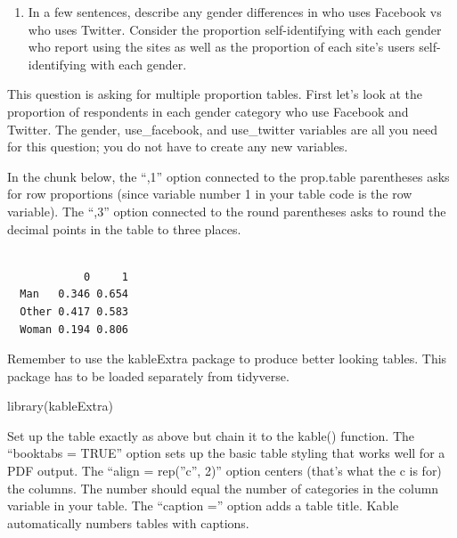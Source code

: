\documentclass[
  letterpaper,
  DIV=11,
  numbers=noendperiod]{scrartcl}
\newenvironment{Shaded}{\begin{snugshade}}{\end{snugshade}}
\newcommand{\DecValTok}[1]{\textcolor[rgb]{0.68,0.00,0.00}{#1}}
\newcommand{\FunctionTok}[1]{\textcolor[rgb]{0.28,0.35,0.67}{#1}}
\newcommand{\NormalTok}[1]{\textcolor[rgb]{0.00,0.23,0.31}{#1}}
\newcommand{\SpecialCharTok}[1]{\textcolor[rgb]{0.37,0.37,0.37}{#1}}
\providecommand{\tightlist}{%
  \setlength{\itemsep}{0pt}\setlength{\parskip}{0pt}}\usepackage{longtable,booktabs,array}
\begin{document}
\begin{enumerate}
\def\labelenumi{\arabic{enumi}.}
\tightlist
\item
  In a few sentences, describe any gender differences in who uses
  Facebook vs who uses Twitter. Consider the proportion self-identifying
  with each gender who report using the sites as well as the proportion
  of each site's users self-identifying with each gender.
\end{enumerate}

This question is asking for multiple proportion tables. First let's look
at the proportion of respondents in each gender category who use
Facebook and Twitter. The gender, use\_facebook, and use\_twitter
variables are all you need for this question; you do not have to create
any new variables.

In the chunk below, the ``,1'' option connected to the prop.table
parentheses asks for row proportions (since variable number 1 in your
table code is the row variable). The ``,3'' option connected to the
round parentheses asks to round the decimal points in the table to three
places.

\begin{Shaded}
\end{Shaded}

\begin{verbatim}
       
            0     1
  Man   0.346 0.654
  Other 0.417 0.583
  Woman 0.194 0.806
\end{verbatim}

Remember to use the kableExtra package to produce better looking tables.
This package has to be loaded separately from tidyverse.

\begin{Shaded}
\begin{Highlighting}[]
\FunctionTok{library}\NormalTok{(kableExtra)}
\end{Highlighting}
\end{Shaded}

Set up the table exactly as above but chain it to the kable() function.
The ``booktabs = TRUE'' option sets up the basic table styling that
works well for a PDF output. The ``align = rep(''c'', 2)'' option
centers (that's what the c is for) the columns. The number should equal
the number of categories in the column variable in your table. The
``caption ='' option adds a table title. Kable automatically numbers
tables with captions.
\end{document}
